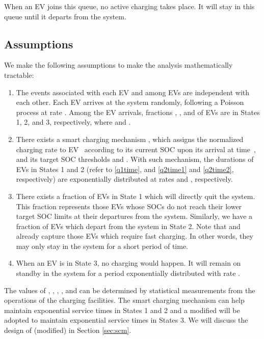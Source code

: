 \documentclass[journal]{IEEEtran}
\begin{document}
When an EV joins this queue, no active charging takes place.  It will stay in
this queue until it departs from the system.
 
\subsection{Assumptions} \label{subsec:assumptions}

We make the following assumptions to make the analysis mathematically tractable:
\begin{enumerate}
\item The events associated with each EV and among EVs are independent with
      each other.  Each EV arrives at the system randomly, following a
      Poisson process at rate .  Among the EV arrivals, fractions , ,
      and  of EVs are in States 1, 2, and 3, respectively, where
       and .

\item There exists a smart charging mechanism
      , which
      assigns the normalized charging rate  to EV~ according to its
      current SOC  upon its arrival at time~, and its target SOC 
      thresholds  and .  With such mechanism, the durations of EVs
      in States 1 and 2 (refer to \eqref{q1time}, and \eqref{q2time1} and
      \eqref{q2time2}, respectively) are exponentially distributed at rates
       and , respectively.

\item There exists a fraction  of EVs in State 1 which will directly quit
      the system.  This fraction represents those EVs whose SOCs do not reach
      their lower target SOC limits at their departures from the system.
      Similarly, we have a fraction  of EVs which depart from the system in
      State 2.  Note that  and  already capture those EVs which
      require fast charging.  In other words, they may only stay in the system
      for a short period of time.

\item When an EV is in State 3, no charging would happen. It will remain on
      standby in the system for a period  exponentially distributed with
      rate .
\end{enumerate}
  
The values of , , , , and  can be
determined by statistical measurements from the operations of the charging
facilities.  The smart charging mechanism  can help maintain exponential service times in States 1 and 2 and a modified  will be adopted to maintain exponential service times in States 3. We will discuss the design of (modified)  in Section \ref{sec:scm}.
\end{document}
